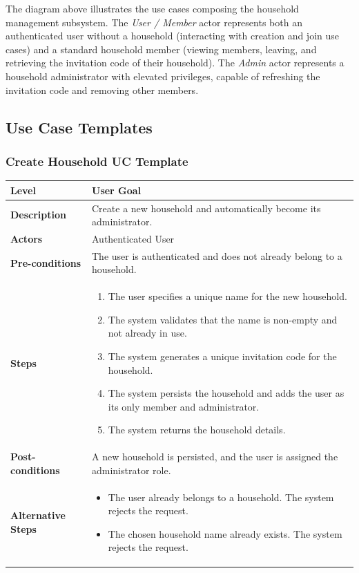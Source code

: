 The diagram above illustrates the use cases composing the household management subsystem. The \textit{User / Member} actor represents both an authenticated user without a household (interacting with creation and join use cases) and a standard household member (viewing members, leaving, and retrieving the invitation code of their household). The \textit{Admin} actor represents a household administrator with elevated privileges, capable of refreshing the invitation code and removing other members.

\subsection{Use Case Templates}

\subsubsection{Create Household UC Template}
\begin{longtable}{|p{3.5cm}|p{10.3cm}|}
\hline
\rowcolor{UCRow} \textbf{Level} & User Goal \\ \hline
\textbf{Description} & Create a new household and automatically become its administrator. \\ \hline
\rowcolor{UCRow} \textbf{Actors} & Authenticated User \\ \hline
\textbf{Pre-conditions} & The user is authenticated and does not already belong to a household. \\ \hline
\rowcolor{UCRow} \textbf{Steps} &
\begin{enumerate}[nosep, leftmargin=*]
    \item The user specifies a unique name for the new household.
    \item The system validates that the name is non-empty and not already in use.
    \item The system generates a unique invitation code for the household.
    \item The system persists the household and adds the user as its only member and administrator.
    \item The system returns the household details.
\end{enumerate} \\ \hline
\textbf{Post-conditions} & A new household is persisted, and the user is assigned the administrator role. \\ \hline
\rowcolor{UCRow} \textbf{Alternative Steps} &
\begin{itemize}[nosep, leftmargin=2.5em]
    \item[\textbf{A1.}] The user already belongs to a household. The system rejects the request.
    \item[\textbf{A2.}] The chosen household name already exists. The system rejects the request.
\end{itemize} \\ \hline
\end{longtable}

